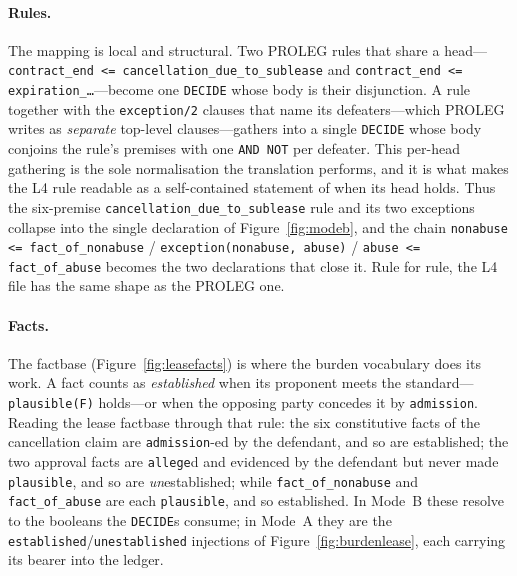 \documentclass[sigconf,nonacm]{acmart}
\newcommand{\code}[1]{\texttt{\small #1}}
\begin{document}
\paragraph{Rules.} The mapping is local and structural. Two PROLEG rules that
share a head---\code{contract\_end <= cancellation\_due\_to\_sublease} and
\code{contract\_end <= expiration\_\ldots}---become one \code{DECIDE} whose
body is their disjunction. A rule together with the \code{exception/2} clauses
that name its defeaters---which PROLEG writes as \emph{separate} top-level
clauses---gathers into a single \code{DECIDE} whose body conjoins the rule's
premises with one \code{AND NOT} per defeater. This per-head gathering is the
sole normalisation the translation performs, and it is what makes the L4 rule
readable as a self-contained statement of when its head holds. Thus the
six-premise \code{cancellation\_due\_to\_sublease} rule and its two exceptions
collapse into the single declaration of Figure~\ref{fig:modeb}, and the chain
\code{nonabuse <= fact\_of\_nonabuse} / \code{exception(nonabuse, abuse)} /
\code{abuse <= fact\_of\_abuse} becomes the two declarations that close it.
Rule for rule, the L4 file has the same shape as the PROLEG one.

\paragraph{Facts.} The factbase (Figure~\ref{fig:leasefacts}) is where the
burden vocabulary does its work. A fact counts as \emph{established} when its
proponent meets the standard---\code{plausible(F)} holds---or when the
opposing party concedes it by \code{admission}. Reading the lease factbase
through that rule: the six constitutive facts of the cancellation claim are
\code{admission}-ed by the defendant, and so are established; the two approval
facts are \code{allege}d and evidenced by the defendant but never made
\code{plausible}, and so are \emph{un}established; while
\code{fact\_of\_nonabuse} and \code{fact\_of\_abuse} are each \code{plausible},
and so established. In Mode~B these resolve to the booleans the \code{DECIDE}s
consume; in Mode~A they are the \code{established}/\code{unestablished}
injections of Figure~\ref{fig:burdenlease}, each carrying its bearer into the
ledger.
\end{document}

